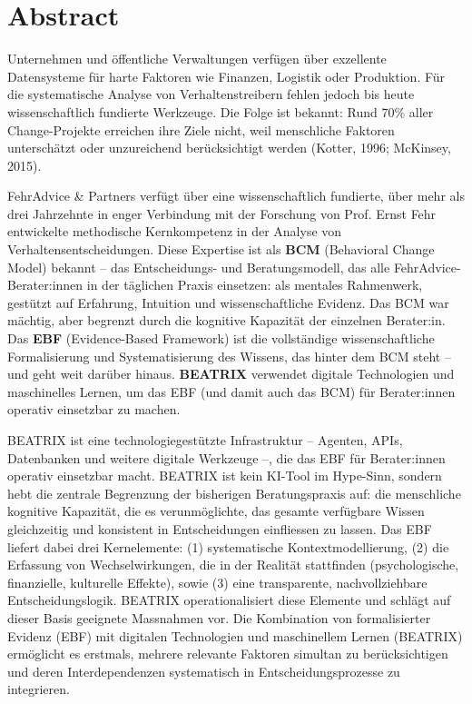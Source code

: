 \documentclass[11pt,a4paper]{article}
\begin{document}

\tableofcontents
\newpage


\section*{Abstract}

Unternehmen und öffentliche Verwaltungen verfügen über exzellente Datensysteme für harte Faktoren wie Finanzen, Logistik oder Produktion. Für die systematische Analyse von Verhaltenstreibern fehlen jedoch bis heute wissenschaftlich fundierte Werkzeuge. Die Folge ist bekannt: Rund 70\% aller Change-Projekte erreichen ihre Ziele nicht, weil menschliche Faktoren unterschätzt oder unzureichend berücksichtigt werden (Kotter, 1996; McKinsey, 2015).

FehrAdvice \& Partners verfügt über eine wissenschaftlich fundierte, über mehr als drei Jahrzehnte in enger Verbindung mit der Forschung von Prof. Ernst Fehr entwickelte methodische Kernkompetenz in der Analyse von Verhaltensentscheidungen. Diese Expertise ist als \textbf{BCM} (Behavioral Change Model) bekannt -- das Entscheidungs- und Beratungsmodell, das alle FehrAdvice-Berater:innen in der täglichen Praxis einsetzen: als mentales Rahmenwerk, gestützt auf Erfahrung, Intuition und wissenschaftliche Evidenz. Das BCM war mächtig, aber begrenzt durch die kognitive Kapazität der einzelnen Berater:in. Das \textbf{EBF} (Evidence-Based Framework) ist die vollständige wissenschaftliche Formalisierung und Systematisierung des Wissens, das hinter dem BCM steht -- und geht weit darüber hinaus. \textbf{BEATRIX} verwendet digitale Technologien und maschinelles Lernen, um das EBF (und damit auch das BCM) für Berater:innen operativ einsetzbar zu machen.

BEATRIX ist eine technologiegestützte Infrastruktur -- Agenten, APIs, Datenbanken und weitere digitale Werkzeuge --, die das EBF für Berater:innen operativ einsetzbar macht. BEATRIX ist kein KI-Tool im Hype-Sinn, sondern hebt die zentrale Begrenzung der bisherigen Beratungspraxis auf: die menschliche kognitive Kapazität, die es verunmöglichte, das gesamte verfügbare Wissen gleichzeitig und konsistent in Entscheidungen einfliessen zu lassen. Das EBF liefert dabei drei Kernelemente: (1) systematische Kontextmodellierung, (2) die Erfassung von Wechselwirkungen, die in der Realität stattfinden (psychologische, finanzielle, kulturelle Effekte), sowie (3) eine transparente, nachvollziehbare Entscheidungslogik. BEATRIX operationalisiert diese Elemente und schlägt auf dieser Basis geeignete Massnahmen vor. Die Kombination von formalisierter Evidenz (EBF) mit digitalen Technologien und maschinellem Lernen (BEATRIX) ermöglicht es erstmals, mehrere relevante Faktoren simultan zu berücksichtigen und deren Interdependenzen systematisch in Entscheidungsprozesse zu integrieren.
\end{document}
